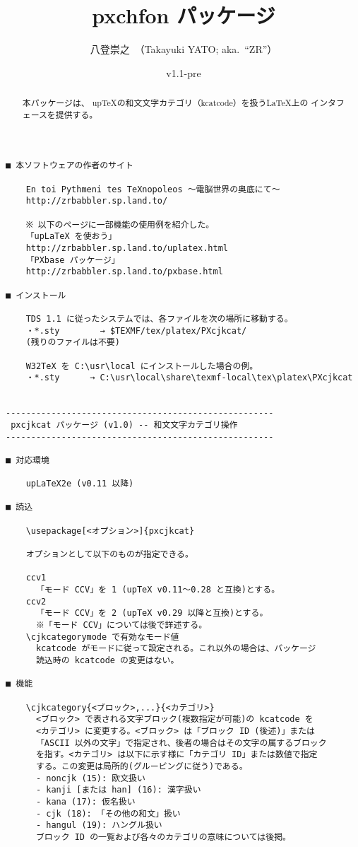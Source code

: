 \documentclass[uplatex,dvipdfmx,a4paper]{jsarticle}
\newcommand{\PkgVersion}{1.1-pre}
\newcommand{\PkgDate}{2012/09/22}
\newcommand{\Pkg}[1]{\textsf{#1}}
\providecommand{\pTeX}{p\TeX}
\providecommand{\upTeX}{u\pTeX}
\begin{document}
\title{\Pkg{pxchfon} パッケージ}
\author{八登崇之\ （Takayuki YATO; aka.~``ZR''）}
\date{v\PkgVersion\quad[\PkgDate]}
\maketitle

\begin{abstract}
本パッケージは、
{\upTeX}の和文文字カテゴリ（kcatcode）を扱う{\LaTeX}上の
インタフェースを提供する。
\end{abstract}

\small
\begin{verbatim}
■ 本ソフトウェアの作者のサイト

    En toi Pythmeni tes TeXnopoleos ～電脳世界の奥底にて～
    http://zrbabbler.sp.land.to/

    ※ 以下のページに一部機能の使用例を紹介した。
    「upLaTeX を使おう」
    http://zrbabbler.sp.land.to/uplatex.html
    「PXbase パッケージ」
    http://zrbabbler.sp.land.to/pxbase.html

■ インストール

    TDS 1.1 に従ったシステムでは、各ファイルを次の場所に移動する。
    ・*.sty        → $TEXMF/tex/platex/PXcjkcat/
    (残りのファイルは不要)

    W32TeX を C:\usr\local にインストールした場合の例。
    ・*.sty      → C:\usr\local\share\texmf-local\tex\platex\PXcjkcat


-----------------------------------------------------
 pxcjkcat パッケージ (v1.0) -- 和文文字カテゴリ操作 
-----------------------------------------------------

■ 対応環境

    upLaTeX2e (v0.11 以降)

■ 読込

    \usepackage[<オプション>]{pxcjkcat}

    オプションとして以下のものが指定できる。

    ccv1
      「モード CCV」を 1 (upTeX v0.11～0.28 と互換)とする。
    ccv2
      「モード CCV」を 2 (upTeX v0.29 以降と互換)とする。
      ※「モード CCV」については後で詳述する。
    \cjkcategorymode で有効なモード値
      kcatcode がモードに従って設定される。これ以外の場合は、パッケージ
      読込時の kcatcode の変更はない。

■ 機能

    \cjkcategory{<ブロック>,...}{<カテゴリ>}
      <ブロック> で表される文字ブロック(複数指定が可能)の kcatcode を
      <カテゴリ> に変更する。<ブロック> は「ブロック ID (後述)」または
      「ASCII 以外の文字」で指定され、後者の場合はその文字の属するブロック
      を指す。<カテゴリ> は以下に示す様に「カテゴリ ID」または数値で指定
      する。この変更は局所的(グルーピングに従う)である。
      - noncjk (15): 欧文扱い
      - kanji [または han] (16): 漢字扱い
      - kana (17): 仮名扱い
      - cjk (18): 「その他の和文」扱い
      - hangul (19): ハングル扱い
      ブロック ID の一覧および各々のカテゴリの意味については後掲。


\end{verbatim}
\end{document}
